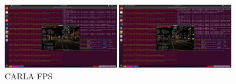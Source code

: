 \begin{figure}[htbp]
	\centerline{\includegraphics[width=0.45\textwidth,trim={22.5cm 10.5cm 22.5cm 12cm},clip]{resources/chapter-4/CARLA-5FPS.JPG}}
	\centerline{\includegraphics[width=0.45\textwidth,trim={22.5cm 10.5cm 22.5cm 12cm},clip]{resources/chapter-4/CARLA-13FPS.JPG}}
	\caption{CARLA FPS}
	\label{fig-section-6-carla-fps}
\end{figure}
